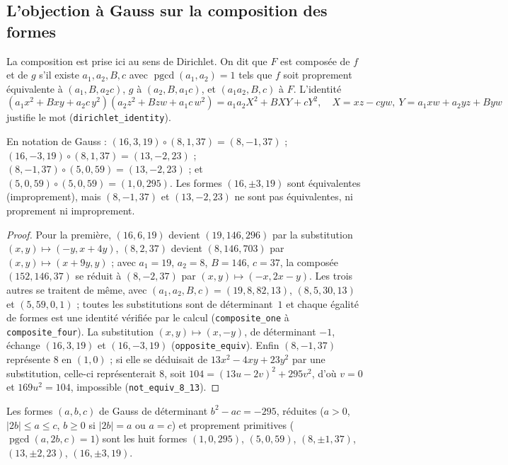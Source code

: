 \subsection*{L'objection à Gauss sur la composition des formes}

La composition est prise ici au sens de Dirichlet. On dit que $F$ est composée de $f$ et de $g$ s'il existe $a_1, a_2, B, c$ avec $\operatorname{pgcd}(a_1, a_2) = 1$ tels que $f$ soit proprement équivalente à $(a_1, B, a_2c)$, $g$ à $(a_2, B, a_1c)$, et $(a_1a_2, B, c)$ à $F$. L'identité
\[ (a_1x^2 + Bxy + a_2c\,y^2)(a_2z^2 + Bzw + a_1c\,w^2) = a_1a_2X^2 + BXY + cY^2, \quad X = xz - cyw,\ Y = a_1xw + a_2yz + Byw \]
justifie le mot (\texttt{dirichlet\_identity}).

\begin{enonce}
En notation de Gauss : $(16, 3, 19) \circ (8, 1, 37) = (8, -1, 37)$ ; $(16, -3, 19) \circ (8, 1, 37) = (13, -2, 23)$ ; $(8, -1, 37) \circ (5, 0, 59) = (13, -2, 23)$ ; et $(5, 0, 59) \circ (5, 0, 59) = (1, 0, 295)$. Les formes $(16, \pm 3, 19)$ sont équivalentes (improprement), mais $(8, -1, 37)$ et $(13, -2, 23)$ ne sont pas équivalentes, ni proprement ni improprement.
\end{enonce}

\begin{proof}
Pour la première, $(16, 6, 19)$ devient $(19, 146, 296)$ par la substitution $(x, y) \mapsto (-y, x + 4y)$, $(8, 2, 37)$ devient $(8, 146, 703)$ par $(x, y) \mapsto (x + 9y, y)$ ; avec $a_1 = 19$, $a_2 = 8$, $B = 146$, $c = 37$, la composée $(152, 146, 37)$ se réduit à $(8, -2, 37)$ par $(x, y) \mapsto (-x, 2x - y)$. Les trois autres se traitent de même, avec $(a_1, a_2, B, c) = (19, 8, 82, 13)$, $(8, 5, 30, 13)$ et $(5, 59, 0, 1)$ ; toutes les substitutions sont de déterminant~$1$ et chaque égalité de formes est une identité vérifiée par le calcul (\texttt{composite\_one} à \texttt{composite\_four}). La substitution $(x, y) \mapsto (x, -y)$, de déterminant $-1$, échange $(16, 3, 19)$ et $(16, -3, 19)$ (\texttt{opposite\_equiv}). Enfin $(8, -1, 37)$ représente $8$ en $(1, 0)$ ; si elle se déduisait de $13x^2 - 4xy + 23y^2$ par une substitution, celle-ci représenterait $8$, soit $104 = (13u - 2v)^2 + 295v^2$, d'où $v = 0$ et $169u^2 = 104$, impossible (\texttt{not\_equiv\_8\_13}).
\end{proof}

\begin{enonce}
Les formes $(a, b, c)$ de Gauss de déterminant $b^2 - ac = -295$, réduites ($a > 0$, $|2b| \leq a \leq c$, $b \geq 0$ si $|2b| = a$ ou $a = c$) et proprement primitives ($\operatorname{pgcd}(a, 2b, c) = 1$) sont les huit formes $(1, 0, 295)$, $(5, 0, 59)$, $(8, \pm 1, 37)$, $(13, \pm 2, 23)$, $(16, \pm 3, 19)$.
\end{enonce}

